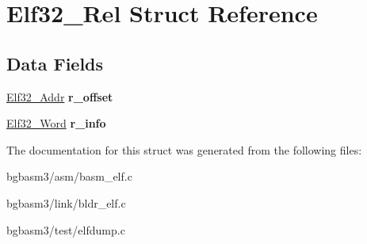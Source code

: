 \hypertarget{structElf32__Rel}{\section{Elf32\-\_\-\-Rel Struct Reference}
\label{structElf32__Rel}
}
\subsection*{Data Fields}
\begin{DoxyCompactItemize}
\item 
\hypertarget{structElf32__Rel_addcf5ef67ababeb4940889e912c11eff}{\hyperlink{structElf32__Addr}{Elf32\-\_\-\-Addr} {\bfseries r\-\_\-offset}}\label{structElf32__Rel_addcf5ef67ababeb4940889e912c11eff}

\item 
\hypertarget{structElf32__Rel_a81c52bb1589056c5d37d58b9bfe2a046}{\hyperlink{structElf32__Sword}{Elf32\-\_\-\-Word} {\bfseries r\-\_\-info}}\label{structElf32__Rel_a81c52bb1589056c5d37d58b9bfe2a046}

\end{DoxyCompactItemize}


The documentation for this struct was generated from the following files\-:\begin{DoxyCompactItemize}
\item 
bgbasm3/asm/basm\-\_\-elf.\-c\item 
bgbasm3/link/bldr\-\_\-elf.\-c\item 
bgbasm3/test/elfdump.\-c\end{DoxyCompactItemize}
